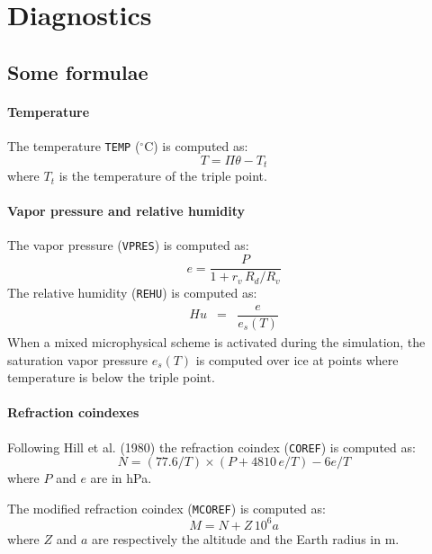 \chapter{Diagnostics}
\minitoc


\section{Some formulae}

\subsubsection{Temperature}
The temperature {\tt TEMP} ($^\circ$C) is computed as:
\begin{equation}
T = \Pi \theta - T_t
\end{equation}
where $T_t$ is the temperature of the triple point.


\subsubsection{Vapor pressure  and  relative humidity}
The vapor pressure ({\tt VPRES}) is computed as:
\begin{equation}
e = \dfrac{P}{1 + r_v \, R_d/R_v} 
\end{equation}
The relative humidity ({\tt REHU}) is computed as:
\begin{eqnarray}
Hu &=& \dfrac{e}{e_s(T)} 
\end{eqnarray}
When a mixed microphysical scheme is activated during the simulation,
 the saturation vapor pressure $e_s(T)$ is computed over ice
 at points where temperature is below the triple point.
 

\subsubsection{Refraction coindexes}
Following Hill et al. (1980) the refraction coindex ({\tt COREF}) is computed as:
\begin{equation}
  N = (77.6/T)\times(P+4810\,e/T) -6e/T
\end{equation}
where $P$ and $e$ are in hPa.

\noindent The modified refraction coindex ({\tt MCOREF}) is computed as:
\begin{equation}
  M = N + Z\,10^6 a
\end{equation}
where $Z$ and $a$ are respectively the altitude and the Earth radius in m.


